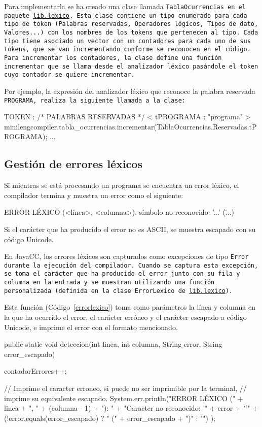 Para implementarla se ha creado una clase llamada \tt{TablaOcurrencias} en el paquete \url{lib.lexico}. Esta clase contiene un tipo enumerado para cada tipo de token (Palabras reservadas, Operadores lógicos, Tipos de dato, Valores...) con los nombres de los tokens que pertenecen al tipo. Cada tipo tiene asociado un vector con un contadores para cada uno de sus tokens, que se van incrementando conforme se reconocen en el código. Para incrementar los contadores, la clase define una función \tt{incrementar} que se llama desde el analizador léxico pasándole el token cuyo contador se quiere incrementar.

Por ejemplo, la expresión del analizador léxico que reconoce la palabra reservada \tt{PROGRAMA}, realiza la siguiente llamada a la clase:

\begin{codigo}
TOKEN : /* PALABRAS RESERVADAS */
{
  < tPROGRAMA : "programa" >
  {
    minilengcompiler.tabla_ocurrencias.incrementar(TablaOcurrencias.Reservadas.tPROGRAMA);
  }
  ...
}
\end{codigo}

\subsection{Gestión de errores léxicos}
Si mientras se está procesando un programa se encuentra un error léxico, el compilador termina y muestra un error como el siguiente:

\begin{codigo}
ERROR LÉXICO (<línea>, <columna>): símbolo no reconocido: '...' (\u...)
\end{codigo}

Si el carácter que ha producido el error no es ASCII, se muestra escapado con su código Unicode.

En JavaCC, los errores léxicos son capturados como excepciones de tipo \tt{Error} durante la ejecución del compilador. Cuando se captura esta excepción, se toma el carácter que ha producido el error junto con su fila y columna en la entrada y se muestran utilizando una función personalizada (definida en la clase \tt{ErrorLexico} de \url{lib.lexico}).

Esta función (Código~\ref{errorlexico}) toma como parámetros la línea y columna en la que ha ocurrido el error, el carácter erróneo y el carácter escapado a código Unicode, e imprime el error con el formato mencionado.

\begin{codigo}[style=java, keywordstyle=\color{blue}, stringstyle=\color{red},
    caption={Función \tt{ErrorLexico.deteccion}.},
    label={errorlexico}]

public static void deteccion(int linea, int columna, String error, String error_escapado) {
    contadorErrores++;

    // Imprime el caracter erroneo, si puede no ser imprimible por la terminal,
    // imprime su equivalente escapado.
    System.err.println("ERROR LÉXICO (" + linea +
        ", " + (columna - 1) + "): " +
        "Caracter no reconocido: '" + error + "'" +
        (!error.equals(error_escapado) ? " (" + error_escapado + ")" : "")
    );
}
\end{codigo}
